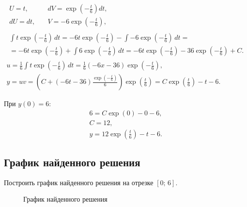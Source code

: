 \documentclass[10pt, a4paper, titlepage]{article}
\begin{document}
\begin{gather*}
    \begin{aligned}
        U=t , &\quad dV=\exp\left(-\frac{t}{6}\right)dt ,\\
        dU=dt , &\quad V=-6\exp\left(-\frac{t}{6}\right) ,
    \end{aligned} 
    \\
    \begin{multlined}
        \int t\exp\left(-\frac{t}{6}\right)\,dt=-6t\exp\left(-\frac{t}{6}\right)-\int-6\exp\left(-\frac{t}{6}\right)\,dt = \\
        = -6t\exp\left(-\frac{t}{6}\right)+\int6\exp\left(-\frac{t}{6}\right)\,dt=-6t\exp\left(-\frac{t}{6}\right)-36\exp\left(-\frac{t}{6}\right)+C .
    \end{multlined}
    \\
    u=\frac{1}{6}\int t\exp\left(-\frac{t}{6}\right)\,dt = \frac{1}{6}(-6x-36)\exp\left(-\frac{t}{6}\right) ,\\
    y=uv=\left(C+(-6t-36)\frac{\exp\left(-\frac{t}{6}\right)}{6}\right)\exp\left(\frac{t}{6}\right)=C\exp\left(\frac{t}{6}\right)-t-6 .
\end{gather*}

При $y(0)=6$:
\begin{gather*}
    6 = C\exp(0)-0-6 ,\\
    C = 12 ,\\
    y = 12\exp\left(\frac{t}{6}\right)-t-6 .
\end{gather*}


\subsection*{График найденного решения}

Построить график найденного решения на отрезке $[0;\,6]$.

\begin{figure}[!ht]
    \centering
    \caption{График найденного решения}
    \label{sr4function1}
\end{figure}
\end{document}
